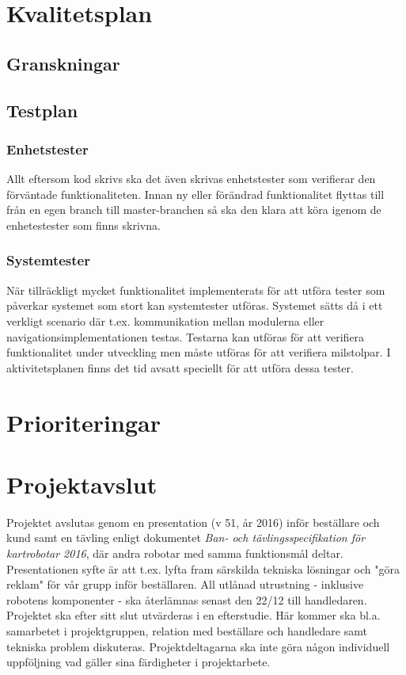 \documentclass{article}
\begin{document}
\section{Kvalitetsplan}

\subsection{Granskningar}
\subsection{Testplan}
\subsubsection{Enhetstester}
Allt eftersom kod skrivs ska det även skrivas enhetstester som verifierar den förväntade funktionaliteten. Innan ny eller förändrad funktionalitet flyttas till från en egen branch till master-branchen så ska den klara att köra igenom de enhetestester som finns skrivna.

\subsubsection{Systemtester}
När tillräckligt mycket funktionalitet implementerats för att utföra tester som påverkar systemet som stort kan systemtester utföras. Systemet sätts då i ett verkligt scenario där t.ex. kommunikation mellan modulerna eller navigationsimplementationen testas. Testarna kan utföras för att verifiera funktionalitet under utveckling men måste utföras för att verifiera milstolpar. I aktivitetsplanen finns det tid avsatt speciellt för att utföra dessa tester.

\section{Prioriteringar}
\section{Projektavslut}
Projektet avslutas genom en presentation (v 51, år 2016) inför beställare och kund samt en tävling enligt dokumentet \textit{Ban- och tävlingsspecifikation för kartrobotar 2016}, där andra robotar med samma funktionsmål deltar. Presentationen syfte är att t.ex. lyfta fram särskilda tekniska lösningar och "göra reklam" för vår grupp inför beställaren. All utlånad utrustning - inklusive robotens komponenter - ska återlämnas senast den 22/12 till handledaren. Projektet ska efter sitt slut utvärderas i en efterstudie. Här kommer ska bl.a. samarbetet i projektgruppen, relation med beställare och handledare samt tekniska problem diskuteras. Projektdeltagarna ska inte göra någon individuell uppföljning vad gäller sina färdigheter i projektarbete.
\end{document}
